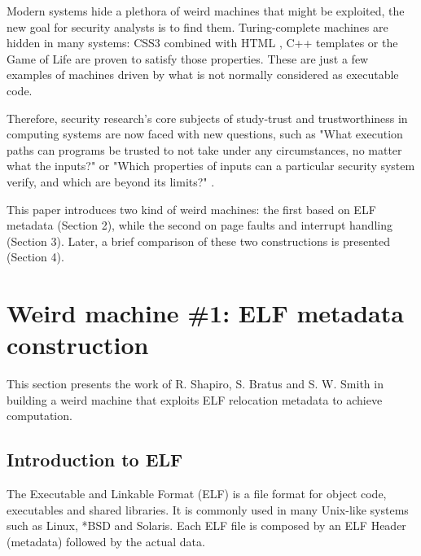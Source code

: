 \documentclass[11pt,twoside,a4paper]{article}
\begin{document}
Modern systems hide a plethora of weird machines that might be exploited, the new goal for security analysts is to find them.   Turing-complete machines are hidden in many systems: CSS3 combined with HTML \cite{html}, C++ templates \cite{cpp_templates} or the Game of Life are proven to satisfy those properties. These are just a few examples of machines driven by what is not normally considered as executable code.

Therefore, security research's core subjects of study-trust and trustworthiness in computing systems are now faced with new questions, such as "What execution paths can programs be trusted to not take under any circumstances, no matter what the inputs?" or "Which properties of inputs can a particular security system verify, and which are beyond its limits?" \cite{bratus}.

This paper introduces two kind of weird machines: the first based on ELF metadata \cite{elf_machine} (Section 2), while the second on page faults and interrupt handling \cite{mmu_machine} (Section 3). Later, a brief comparison of these two constructions is presented (Section 4).



\section{Weird machine \#1: ELF metadata construction}

This section presents the work of R. Shapiro, S. Bratus and S. W. Smith \cite{elf_machine} in building a weird machine that exploits ELF relocation metadata to achieve computation.

\subsection{Introduction to ELF}
The Executable and Linkable Format (ELF) is a file format for object code, executables and shared libraries. It is commonly used in many Unix-like systems such as Linux, *BSD and Solaris.
Each ELF file is composed by an ELF Header (metadata) followed by the actual data.
\end{document}
